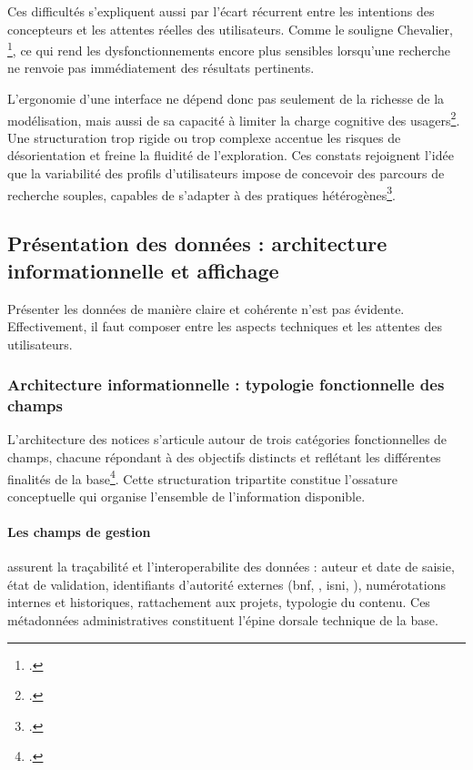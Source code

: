 Ces difficultés s'expliquent aussi par l'écart récurrent entre les intentions des concepteurs et les attentes réelles des utilisateurs. Comme le souligne Chevalier, \footcite{chevalierChapitreErgonomieInterfaces2013}, ce qui rend les dysfonctionnements encore plus sensibles lorsqu'une recherche ne renvoie pas immédiatement des résultats pertinents.

L'ergonomie d'une interface ne dépend donc pas seulement de la richesse de la modélisation, mais aussi de sa capacité à limiter la charge cognitive des usagers\footcite{chevalierChapitreErgonomieInterfaces2013}. Une structuration trop rigide ou trop complexe accentue les risques de désorientation et freine la fluidité de l'exploration. Ces constats rejoignent l'idée que la variabilité des profils d'utilisateurs impose de concevoir des parcours de recherche souples, capables de s'adapter à des pratiques hétérogènes\footcite{chevalierChapitreErgonomieInterfaces2013}.

\subsection{Présentation des données : architecture informationnelle et affichage}

Présenter les données de manière claire et cohérente n'est pas évidente. Effectivement, il faut composer entre les aspects techniques et les attentes des utilisateurs.

\subsubsection{Architecture informationnelle : typologie fonctionnelle des champs}

L'architecture des notices s'articule autour de trois catégories fonctionnelles de champs, chacune répondant à des objectifs distincts et reflétant les différentes finalités de la base\footcite{BaseDonneesPHILIDOR42024}. Cette structuration tripartite constitue l'ossature conceptuelle qui organise l'ensemble de l'information disponible.

\paragraph{Les champs de gestion} assurent la traçabilité et l'\gls{interoperabilite} des données : auteur et date de saisie, état de validation, identifiants d'autorité externes (\gls{bnf}, , \gls{isni}, ), numérotations internes et historiques, rattachement aux projets, typologie du contenu. Ces métadonnées administratives constituent l'épine dorsale technique de la base.

